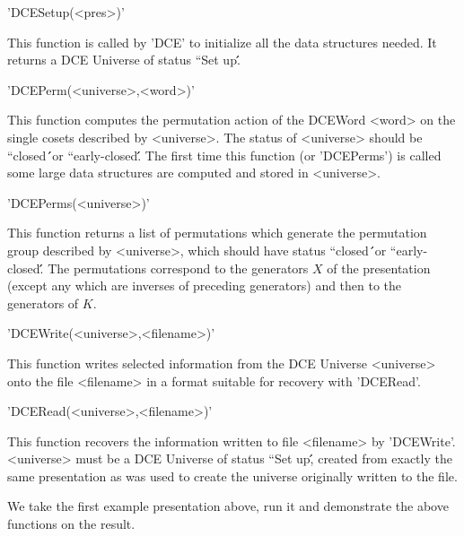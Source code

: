 'DCESetup(<pres>)'

This function is  called by 'DCE' to initialize  all the data  structures
needed. It returns a DCE Universe of status ``Set up\'\'.


'DCEPerm(<universe>,<word>)'

This function computes the permutation  action of  the DCEWord <word>  on
the  single   cosets described by <universe>.    The status of <universe>
should  be ``closed\'\'\   or  ``early-closed\'\'.  The   first time this
function (or 'DCEPerms')  is  called   some  large data  structures   are
computed and stored in <universe>.


'DCEPerms(<universe>)'

This  function   returns  a  list  of  permutations  which   generate the
permutation  group  described  by  <universe>, which  should  have status
``closed\'\'\ or ``early-closed\'\'. The  permutations correspond  to the
generators $X$ of  the presentation  (except  any which  are inverses  of
preceding generators) and then to the generators of $K$.


'DCEWrite(<universe>,<filename>)'

This function writes    selected  information  from  the   DCE   Universe
<universe> onto   the file <filename> in a   format suitable for recovery
with 'DCERead'.


'DCERead(<universe>,<filename>)'

This function recovers  the  information written  to file  <filename>  by
'DCEWrite'. <universe> must be a   DCE Universe of status ``Set   up\'\',
created from  exactly  the same presentation  as was  used to create  the
universe originally written to the file.


We take the first example presentation above,  run it and demonstrate the
above functions on the result.

